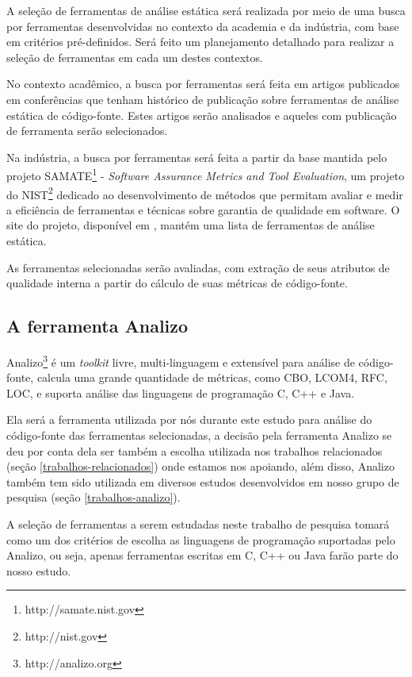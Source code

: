 A seleção de ferramentas de análise estática será realizada por meio de uma
busca por ferramentas desenvolvidas no contexto da academia e da indústria,
com base em critérios pré-definidos. Será feito um planejamento detalhado
para realizar a seleção de ferramentas em cada um destes contextos.

No contexto acadêmico, a busca por ferramentas será feita em artigos
publicados em conferências que tenham histórico de publicação sobre
ferramentas de análise estática de código-fonte.  Estes artigos serão
analisados e aqueles com publicação de ferramenta serão selecionados.

Na indústria, a busca por ferramentas será feita a partir da base mantida pelo
projeto SAMATE\footnote{http://samate.nist.gov} - {\em Software Assurance
Metrics and Tool Evaluation}, um projeto do NIST\footnote{http://nist.gov}
dedicado ao desenvolvimento de métodos que permitam avaliar e medir a
eficiência de ferramentas e técnicas sobre garantia de qualidade em software.
O site do projeto, disponível em , mantém uma lista
de ferramentas de análise estática.

As ferramentas selecionadas serão avaliadas, com extração de
seus atributos de qualidade interna a partir do cálculo de suas métricas de
código-fonte.

\subsection{A ferramenta Analizo}

Analizo\footnote{http://analizo.org} é um {\it toolkit} livre, multi-linguagem
e extensível para análise de código-fonte, calcula uma grande quantidade de
métricas, como CBO, LCOM4, RFC, LOC, e suporta análise das linguagens de
programação C, C++ e Java.

Ela será a ferramenta utilizada por nós durante este estudo para análise do
código-fonte das ferramentas selecionadas, a decisão pela ferramenta Analizo
se deu por conta dela ser também a escolha utilizada nos trabalhos
relacionados (seção \ref{trabalhos-relacionados}) onde estamos nos apoiando,
além disso, Analizo também tem sido utilizada em diversos estudos
desenvolvidos em nosso grupo de pesquisa (seção \ref{trabalhos-analizo}).

A seleção de ferramentas a serem estudadas neste trabalho de pesquisa tomará
como um dos critérios de escolha as linguagens de programação suportadas pelo
Analizo, ou seja, apenas ferramentas escritas em C, C++ ou Java farão parte do
nosso estudo.

